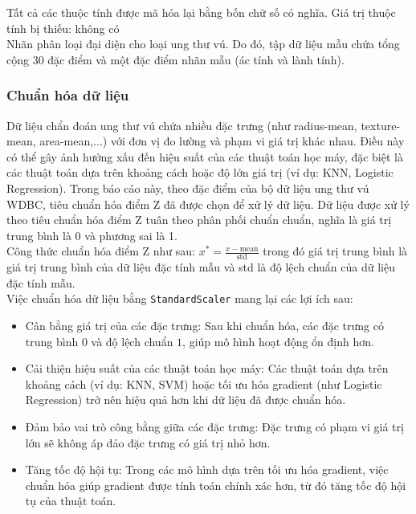 Tất cả các thuộc tính được mã hóa lại bằng bốn chữ số có nghĩa.
Giá trị thuộc tính bị thiếu: không có
\\ Nhãn phân loại đại diện cho loại ung thư vú. Do đó, tập dữ liệu mẫu chứa tổng cộng 30 đặc điểm và một đặc điểm nhãn mẫu (ác tính và lành tính).
\subsubsection{Chuẩn hóa dữ liệu}
Dữ liệu chẩn đoán ung thư vú chứa nhiều đặc trưng (như radius-mean, texture-mean, area-mean,...) với đơn vị đo lường và phạm vi giá trị khác nhau. Điều này có thể gây ảnh hưởng xấu đến hiệu suất của các thuật toán học máy, đặc biệt là các thuật toán dựa trên khoảng cách hoặc độ lớn giá trị (ví dụ: KNN, Logistic Regression). Trong báo cáo này, theo đặc điểm của bộ dữ liệu ung thư vú WDBC, tiêu chuẩn hóa điểm Z đã được chọn để xử lý dữ liệu. Dữ liệu được xử lý theo tiêu chuẩn hóa điểm Z tuân theo phân phối chuẩn chuẩn, nghĩa là giá trị trung bình là 0 và phương sai là 1. \\Công thức chuẩn hóa điểm Z như sau: $x^* = \frac{x - \text{mean}}{\text{std}}$ trong đó giá trị trung bình là giá trị trung bình của dữ liệu đặc tính mẫu và std là độ lệch chuẩn của dữ liệu đặc tính mẫu. 
\\ Việc chuẩn hóa dữ liệu bằng \texttt{StandardScaler} mang lại các lợi ích sau:
\begin{itemize}
    \item {Cân bằng giá trị của các đặc trưng:} Sau khi chuẩn hóa, các đặc trưng có trung bình $0$ và độ lệch chuẩn $1$, giúp mô hình hoạt động ổn định hơn.
    \item {Cải thiện hiệu suất của các thuật toán học máy:} Các thuật toán dựa trên khoảng cách (ví dụ: KNN, SVM) hoặc tối ưu hóa gradient (như Logistic Regression) trở nên hiệu quả hơn khi dữ liệu đã được chuẩn hóa.
    \item {Đảm bảo vai trò công bằng giữa các đặc trưng:} Đặc trưng có phạm vi giá trị lớn sẽ không áp đảo đặc trưng có giá trị nhỏ hơn.
    \item {Tăng tốc độ hội tụ:} Trong các mô hình dựa trên tối ưu hóa gradient, việc chuẩn hóa giúp gradient được tính toán chính xác hơn, từ đó tăng tốc độ hội tụ của thuật toán.
\end{itemize}
